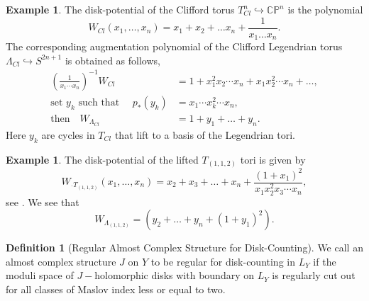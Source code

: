 \documentclass[11pt, oneside,dvipsnames]{amsart}
\newcommand{\<}{\langle}
\renewcommand{\>}{\rangle}
\newcommand{\ol}{\overline{}}
\newcommand{\bC}{\mathbb{C}}
\newcommand{\bP}{\mathbb{P}}
\theoremstyle{definition}
\theoremstyle{definition}
\newtheorem{remark}[Theorem]{Remark}
\newtheorem{defn}[Theorem]{Definition}
\newtheorem{example}[Theorem]{Example}
\numberwithin{equation}{subsection}
\begin{document}
\begin{example}
    The disk-potential of the Clifford torus $T^n_{Cl} \hookrightarrow \bC\bP^n$ is the polynomial $$W_{Cl}(x_1,\dots,x_n) = x_1 + x_2 + \dots x_n + \frac{1}{x_1\dots x_n}. $$ The corresponding augmentation polynomial of the Clifford Legendrian torus $\Lambda_{Cl} \hookrightarrow S^{2n+1}$ is obtained as follows,
\[
\begin{aligned}
\left(\frac{1}{x_1 \cdots x_n}\right)^{-1} W_{Cl}
&= 1 + x_1^2 x_2 \cdots x_n 
   + x_1 x_2^2 \cdots x_n 
   + \dots, \\
\text{set } y_k \text{ such that } 
\quad p_*(y_k) &= x_1 \cdots x_k^2 \cdots x_n, \\
\text{then} \quad
W_{\Lambda_{Cl}} &= 1 + y_1 + \dots + y_n.
\end{aligned}
\]
Here $y_k$ are cycles in $T_{Cl}$ that lift to a basis of the Legendrian tori.
\end{example}

\begin{example}
The disk-potential of the lifted $T_{(1,1,2)}$ tori is given by $$W_{\ol T_{(1,1,2)}}(x_1,\dots,x_n) = x_2 + x_3+\dots +x_n+ \frac{(1+x_1)^2}{x_1x_2^2x_3\cdots x_n},$$ see \cite[Example 4.2]{chw}.
We see that $$W_{\Lambda_{(1,1,2)}} = (y_2 + \dots + y_n + (1+y_1)^2).$$ 
\end{example}






\begin{defn}[Regular Almost Complex Structure for Disk-Counting]
    We call an almost complex structure $J$ on $Y$ to be regular for disk-counting in $L_Y$ if the moduli space of $J-$holomorphic disks with boundary on $L_Y$ is regularly cut out for all classes of Maslov index less or equal to two. 
\end{defn}




\end{document}
